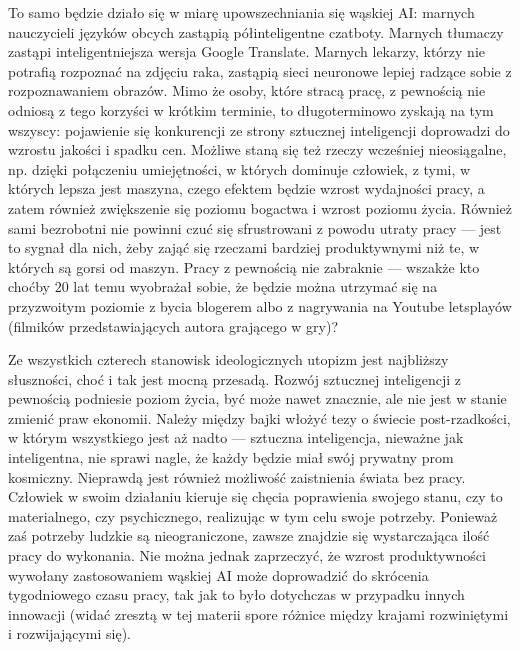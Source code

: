 \documentclass[10pt,a4paper]{article}
\begin{document}
	\par To samo będzie działo się w miarę upowszechniania się wąskiej AI: marnych nauczycieli języków obcych zastąpią półinteligentne czatboty. Marnych tłumaczy zastąpi inteligentniejsza wersja Google Translate. Marnych lekarzy, którzy nie potrafią rozpoznać na zdjęciu raka, zastąpią sieci neuronowe lepiej radzące sobie z rozpoznawaniem obrazów. Mimo że osoby, które stracą pracę, z pewnością nie odniosą z tego korzyści w krótkim terminie, to długoterminowo zyskają na tym wszyscy: pojawienie się konkurencji ze strony sztucznej inteligencji doprowadzi do wzrostu jakości i spadku cen. Możliwe staną się też rzeczy wcześniej nieosiągalne, np. dzięki połączeniu umiejętności, w których dominuje człowiek, z tymi, w których lepsza jest maszyna, czego efektem będzie wzrost wydajności pracy, a zatem również zwiększenie się poziomu bogactwa i wzrost poziomu życia. Również sami bezrobotni nie powinni czuć się sfrustrowani z powodu utraty pracy — jest to sygnał dla nich, żeby zająć się rzeczami bardziej produktywnymi niż te, w których są gorsi od maszyn. Pracy z pewnością nie zabraknie — wszakże kto choćby $20$ lat temu wyobrażał sobie, że będzie można utrzymać się na przyzwoitym poziomie z bycia blogerem albo z nagrywania na Youtube letsplayów (filmików przedstawiających autora grającego w gry)?
	\par Ze wszystkich czterech stanowisk ideologicznych utopizm jest najbliższy słuszności, choć i tak jest mocną przesadą. Rozwój sztucznej inteligencji z pewnością podniesie poziom życia, być może nawet znacznie, ale nie jest w stanie zmienić praw ekonomii. Należy między bajki włożyć tezy o świecie post-rzadkości, w którym wszystkiego jest aż nadto — sztuczna inteligencja, nieważne jak inteligentna, nie sprawi nagle, że każdy będzie miał swój prywatny prom kosmiczny. Nieprawdą jest również możliwość zaistnienia świata bez pracy. Człowiek w swoim działaniu kieruje się chęcia poprawienia swojego stanu, czy to materialnego, czy psychicznego, realizując w tym celu swoje potrzeby. Ponieważ zaś potrzeby ludzkie są nieograniczone, zawsze znajdzie się wystarczająca ilość pracy do wykonania. Nie można jednak zaprzeczyć, że wzrost produktywności wywołany zastosowaniem wąskiej AI może doprowadzić do skrócenia tygodniowego czasu pracy, tak jak to było dotychczas w przypadku innych innowacji (widać zresztą w tej materii spore różnice między krajami rozwiniętymi i rozwijającymi się).
\end{document}
